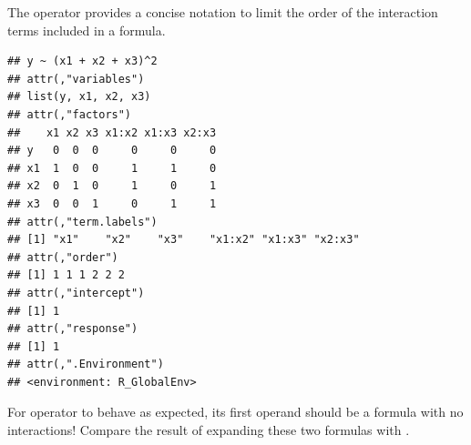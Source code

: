 \documentclass[krantz2]{krantz}\usepackage{knitr}
\begin{document}
The \code{\textasciicircum{}} operator provides a concise notation to limit the order of the interaction terms included in a formula.

\begin{knitrout}\footnotesize
{}\color{fgcolor}\begin{kframe}
\begin{alltt}
 \hlopt{~}  \hlopt{+}  \hlopt{+} \hlopt{^}
 \hlopt{~}  \hlopt{+}  \hlopt{+}  \hlopt{+} \hlopt{:} \hlopt{+} \hlopt{:} \hlopt{+} \hlopt{:}
\end{alltt}
\end{kframe}
\end{knitrout}

\begin{knitrout}\footnotesize
{}\color{fgcolor}\begin{kframe}
\begin{alltt}
 \hlopt{~}  \hlopt{+}  \hlopt{+} \hlopt{^}\hlstd{)}
\end{alltt}
\begin{verbatim}
## y ~ (x1 + x2 + x3)^2
## attr(,"variables")
## list(y, x1, x2, x3)
## attr(,"factors")
##    x1 x2 x3 x1:x2 x1:x3 x2:x3
## y   0  0  0     0     0     0
## x1  1  0  0     1     1     0
## x2  0  1  0     1     0     1
## x3  0  0  1     0     1     1
## attr(,"term.labels")
## [1] "x1"    "x2"    "x3"    "x1:x2" "x1:x3" "x2:x3"
## attr(,"order")
## [1] 1 1 1 2 2 2
## attr(,"intercept")
## [1] 1
## attr(,"response")
## [1] 1
## attr(,".Environment")
## <environment: R_GlobalEnv>
\end{verbatim}
\end{kframe}
\end{knitrout}

\begin{advplayground}
For operator \code{\textasciicircum{}} to behave as expected, its first operand should be a formula with no interactions!  Compare the result of expanding these two formulas with .

\begin{knitrout}\footnotesize
{}\color{fgcolor}\begin{kframe}
\begin{alltt}
 \hlopt{~}  \hlopt{+}  \hlopt{+} \hlopt{^}
 \hlopt{~}  \hlopt{*}  \hlopt{*} \hlopt{^}
\end{alltt}
\end{kframe}
\end{knitrout}

\end{advplayground}
\end{document}
